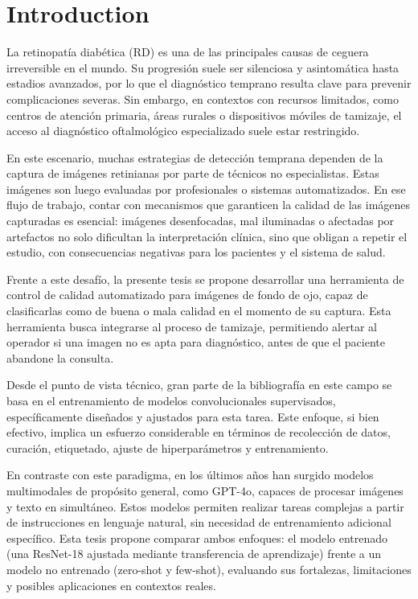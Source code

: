 \chapter*{Introduction}

La retinopatía diabética (RD) es una de las principales causas de ceguera irreversible en el mundo. Su progresión suele ser silenciosa y asintomática hasta estadios avanzados, por lo que el diagnóstico temprano resulta clave para prevenir complicaciones severas. Sin embargo, en contextos con recursos limitados, como centros de atención primaria, áreas rurales o dispositivos móviles de tamizaje, el acceso al diagnóstico oftalmológico especializado suele estar restringido.

En este escenario, muchas estrategias de detección temprana dependen de la captura de imágenes retinianas por parte de técnicos no especialistas. Estas imágenes son luego evaluadas por profesionales o sistemas automatizados. En ese flujo de trabajo, contar con mecanismos que garanticen la calidad de las imágenes capturadas es esencial: imágenes desenfocadas, mal iluminadas o afectadas por artefactos no solo dificultan la interpretación clínica, sino que obligan a repetir el estudio, con consecuencias negativas para los pacientes y el sistema de salud.

Frente a este desafío, la presente tesis se propone desarrollar una herramienta de control de calidad automatizado para imágenes de fondo de ojo, capaz de clasificarlas como de buena o mala calidad en el momento de su captura. Esta herramienta busca integrarse al proceso de tamizaje, permitiendo alertar al operador si una imagen no es apta para diagnóstico, antes de que el paciente abandone la consulta.

Desde el punto de vista técnico, gran parte de la bibliografía en este campo se basa en el entrenamiento de modelos convolucionales supervisados, específicamente diseñados y ajustados para esta tarea. Este enfoque, si bien efectivo, implica un esfuerzo considerable en términos de recolección de datos, curación, etiquetado, ajuste de hiperparámetros y entrenamiento.

En contraste con este paradigma, en los últimos años han surgido modelos multimodales de propósito general, como GPT-4o, capaces de procesar imágenes y texto en simultáneo. Estos modelos permiten realizar tareas complejas a partir de instrucciones en lenguaje natural, sin necesidad de entrenamiento adicional específico. Esta tesis propone comparar ambos enfoques: el modelo entrenado (una ResNet-18 ajustada mediante transferencia de aprendizaje) frente a un modelo no entrenado (zero-shot y few-shot), evaluando sus fortalezas, limitaciones y posibles aplicaciones en contextos reales.

